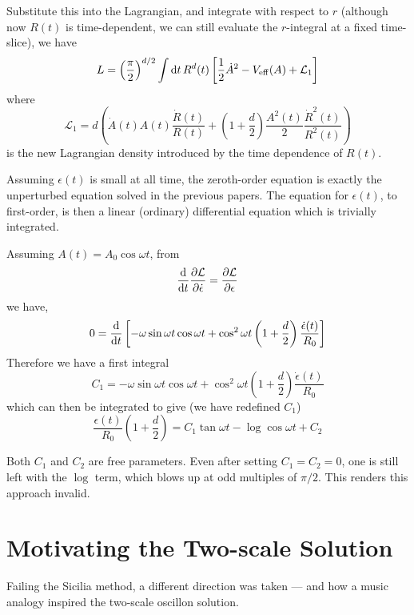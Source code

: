 \documentclass{report}
\begin{document}
Substitute this into the Lagrangian, and integrate with respect to $r$ (although now $R(t)$ is time-dependent, we can still evaluate the $r$-integral at a fixed time-slice), we have
\begin{equation}
 L = \left(\frac{\pi}{2}\right)^{d/2}\int {\rm d}t\, R^d(t) \left[ \frac{1}{2}\dot{A}^2 - V_{\rm eff} (A) +
    \mathcal{L}_1\right]
\end{equation}
where
\begin{equation}
  \mathcal{L}_1 = d\left( \dot{A}(t)A(t)\frac{\dot{R}(t)}{R(t)} +\left(1+\frac{d}{2}\right)\frac{A^2(t)}{2}\frac{\dot{R}^2(t)}{R^2(t)}\right)
\end{equation}
is the new Lagrangian density introduced by the time dependence of $R(t)$.

Assuming $\epsilon(t)$ is small at all time, the zeroth-order equation is exactly the unperturbed equation solved in the previous papers. The equation for $\epsilon(t)$, to first-order, is then a linear (ordinary) differential equation which is trivially integrated.

Assuming $A(t)=A_0\cos\omega t$, from
\begin{equation}
  \frac{\rm d}{{\rm d}t}\frac{\partial \mathcal{L}}{\partial \dot{\epsilon}} =
  \frac{\partial\mathcal{L}}{\partial \epsilon}
\end{equation}
we have,
\begin{equation}
  0 = \frac{\rm d}{{\rm d}t}\left[-\omega\sin\omega t\cos\omega t + \cos^2\omega t\left(1+\frac{d}{2}
    \right)\frac{\dot{\epsilon}(t)}{R_0}\right]
\end{equation}
Therefore we have a first integral
\begin{equation}
  C_1 = -\omega\sin\omega t\cos\omega t + \cos^2\omega t\left(1+\frac{d}{2}
  \right)\frac{\dot{\epsilon}(t)}{R_0}
\end{equation}
which can then be integrated to give (we have redefined $C_1$)
\begin{equation}\label{sol}
  \frac{\epsilon(t)}{R_0}\left(1+\frac{d}{2}\right)
  = C_1\tan\omega t  - \log\cos\omega t + C_2
\end{equation}

Both $C_1$ and $C_2$ are free parameters. Even after setting $C_1=C_2=0$, one is still left with the $\log$ term, which blows up at odd multiples of $\pi/2$. This renders this approach invalid.

\chapter{Motivating the Two-scale Solution}
Failing the Sicilia method, a different direction was taken --- and how a music analogy inspired the two-scale oscillon solution.
\end{document}
